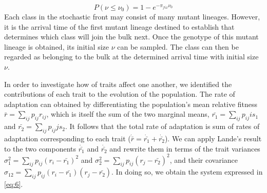 \documentclass[11pt,twocolumn]{article}
\begin{document}
% 
% 
% 
% 
% 
\begin{equation} \label{eq:5}
P(\nu \leq \nu_0) = 1- e^{-\pi_{fix} \nu_0}
\end{equation}
Each class in the stochastic front may consist of many mutant lineages. However, it is the arrival time of the first mutant lineage destined to establish that determines which class will join the bulk next. Once the genotype of this mutant lineage is obtained, its initial size $\nu$ can be sampled. The class can then be regarded as belonging to the bulk at the determined arrival time with initial size $\nu$. \par
% 
% 
% 
% 
% 
In order to investigate how of traits affect one another, we identified the contributions of each trait to the evolution of the population. The rate of adaptation can obtained by differentiating the population's mean relative fitness $\bar{r}=\sum_{ij} p_{ij} r_{ij}$, which is itself the sum of the two marginal means, $\bar{r_1}=\sum_{ij} p_{ij} is_1$ and $\bar{r_2}=\sum_{ij} p_{ij} j s_2$.  It follows that the total rate of adaptation is sum of rates of adaptation corresponding to each trait ($\dot{\bar{r}}=\dot{\bar{r_1}} +\dot{\bar{r_2}}$).  We can apply Lande's result to the two components $\dot{\bar{r_1}} $ and $\dot{\bar{r_2}} $ and rewrite them in terms of the trait variances $\sigma_1^2 = \sum_{ij} p_{ij} (r_i-\bar{r_1})^2$ and $\sigma_2^2 = \sum_{ij} p_{ij} (r_j-\bar{r_2})^2$, and their covariance $\sigma_{12} =\sum_{ij} p_{ij} (r_i-\bar{r_1})(r_j-\bar{r_2})$.  In doing so, we obtain the system expressed in \eqref{eq:6}.
\end{document}
